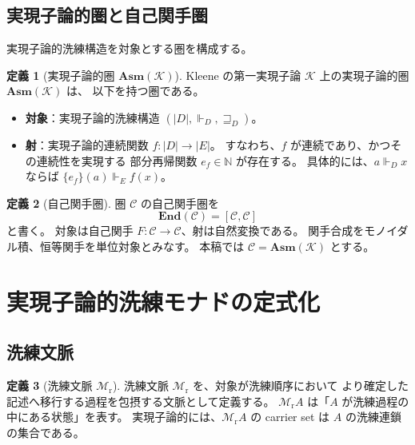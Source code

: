 \documentclass[11pt,a4paper]{article}
\theoremstyle{definition}
\newtheorem{definition}{定義}[section]
\newcommand{\Mr}{\mathcal{M}_{\mathrm{r}}}
\newcommand{\End}{\mathbf{End}}
\newcommand{\Asm}{\mathbf{Asm}}
\newcommand{\Real}{\Vdash}
\begin{document}
\subsection{実現子論的圏と自己関手圏}

実現子論的洗練構造を対象とする圏を構成する。

\begin{definition}[実現子論的圏 $\Asm(\mathcal{K})$]
Kleene の第一実現子論 $\mathcal{K}$ 上の実現子論的圏 $\Asm(\mathcal{K})$ は、
以下を持つ圏である。

\begin{itemize}
\item \textbf{対象}：実現子論的洗練構造 $(|D|, \Real_D, \sqsupseteq_D)$。
\item \textbf{射}：実現子論的連続関数 $f:|D|\to|E|$。
  すなわち、$f$ が連続であり、かつその連続性を実現する
  部分再帰関数 $e_f \in \mathbb{N}$ が存在する。
  具体的には、$a \Real_D x$ ならば $\{e_f\}(a) \Real_E f(x)$。
\end{itemize}
\end{definition}

\begin{definition}[自己関手圏]
圏 $\mathcal{C}$ の自己関手圏を
\begin{equation}
\End(\mathcal{C}) = [\mathcal{C},\mathcal{C}]
\end{equation}
と書く。
対象は自己関手 $F:\mathcal{C}\to\mathcal{C}$、射は自然変換である。
関手合成をモノイダル積、恒等関手を単位対象とみなす。
本稿では $\mathcal{C} = \Asm(\mathcal{K})$ とする。
\end{definition}

\section{実現子論的洗練モナドの定式化}

\subsection{洗練文脈}

\begin{definition}[洗練文脈 $\Mr$]
洗練文脈 $\Mr$ を、対象が洗練順序において
より確定した記述へ移行する過程を包摂する文脈として定義する。
$\Mr A$ は「$A$ が洗練過程の中にある状態」を表す。
実現子論的には、$\Mr A$ の carrier set は $A$ の洗練連鎖の集合である。
\end{definition}
\end{document}

